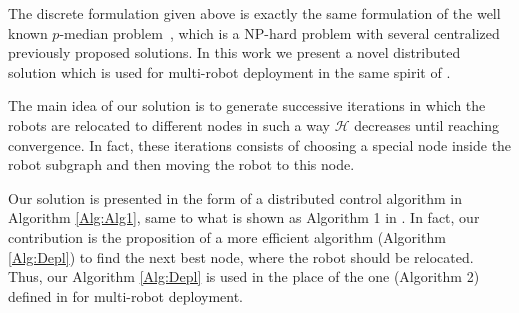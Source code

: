 \documentclass[smallcondensed]{svjour3}
\begin{document}
The discrete formulation given above is exactly the same formulation of the well known $p$-median problem~\citep{Reese2006}, which is a NP-hard problem with several centralized previously proposed solutions. 
%
In this work we present a novel distributed solution which is used for multi-robot deployment in the same spirit of \cite{Yun2013}.

The main idea of our solution is to generate successive iterations in which the robots are relocated to different nodes in such a way $\mathcal{H}$ decreases until reaching convergence. In fact, these iterations consists of choosing a special node inside the robot subgraph and then moving the robot to this node.
%

Our solution is presented in the form of a distributed control algorithm in Algorithm \ref{Alg:Alg1}, same to what is shown as Algorithm 1 in \citep{Yun2013}. In fact, our contribution is the proposition of a more efficient algorithm  (Algorithm \ref{Alg:Depl}) to find the next best node, where the robot should be relocated. Thus, our Algorithm \ref{Alg:Depl} is used in the place of the one (Algorithm 2) defined in \citep{Yun2013} for multi-robot deployment. 
\end{document}
